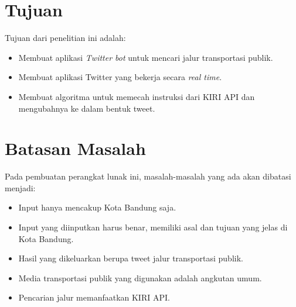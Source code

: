\section{Tujuan}
Tujuan dari penelitian ini adalah:
\begin{itemize}
	\item Membuat aplikasi \textit{Twitter bot} untuk mencari jalur transportasi publik.
	\item Membuat aplikasi Twitter yang bekerja secara \textit{real time}.
	\item Membuat algoritma untuk memecah instruksi dari KIRI API dan mengubahnya ke dalam bentuk tweet.
\end{itemize}

\section{Batasan Masalah}
Pada pembuatan perangkat lunak ini, masalah-masalah yang ada akan dibatasi menjadi:
\begin{itemize}
	\item Input hanya mencakup Kota Bandung saja.
	\item Input yang diinputkan harus benar, memiliki asal dan tujuan yang jelas di Kota Bandung.
	\item Hasil yang dikeluarkan berupa tweet jalur transportasi publik.
	\item Media transportasi publik yang digunakan adalah angkutan umum.
	\item Pencarian jalur memanfaatkan KIRI API.
\end{itemize}

